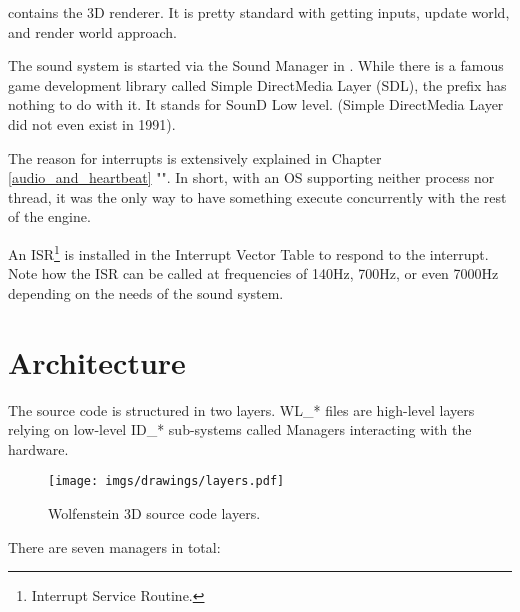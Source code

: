 \documentclass[book.tex]{subfiles}
\begin{document}
\par
\begin{minipage}{\textwidth}

\end{minipage}
\par
{} contains the 3D renderer. It is pretty standard with getting inputs, update world, and render world approach.\\
\par
\begin{minipage}{\textwidth}

\end{minipage}
\par
The sound system is started via the Sound Manager in . While there is a famous game development library called Simple DirectMedia Layer (SDL), the prefix  has nothing to do with it. It stands for SounD Low level. (Simple DirectMedia Layer did not even exist in 1991).\\
\par
The reason for interrupts is extensively explained in Chapter \ref{audio_and_heartbeat} "". In short, with an OS supporting neither process nor thread, it was the only way to have something execute concurrently with the rest of the engine.\\
\par
An ISR\footnote{Interrupt Service Routine.} is installed in the Interrupt Vector Table to respond to the interrupt. Note how the ISR can be called at frequencies of 140Hz, 700Hz, or even 7000Hz depending on the needs of the sound system.\\
\par
\begin{minipage}{\textwidth}

\end{minipage}
\par
















\section{Architecture}

The source code is structured in two layers. WL\_* files are high-level layers relying on low-level ID\_* sub-systems called Managers interacting with the hardware.\\
\par
\begin{figure}[H]
\centering
\texttt{[image: imgs/drawings/layers.pdf]} 
\caption{Wolfenstein 3D source code layers.}
 \end{figure}
 \par
There are seven managers in total:\\
\end{document}
